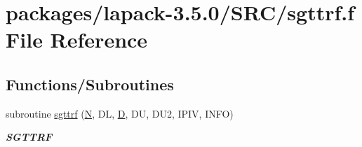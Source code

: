 \hypertarget{sgttrf_8f}{}\section{packages/lapack-\/3.5.0/\+S\+R\+C/sgttrf.f File Reference}
\label{sgttrf_8f}
\subsection*{Functions/\+Subroutines}
\begin{DoxyCompactItemize}
\item 
subroutine \hyperlink{group__realGTcomputational_ga0cd464cdbfc79c87c6b3fa3d1e139abf}{sgttrf} (\hyperlink{polmisc_8c_a0240ac851181b84ac374872dc5434ee4}{N}, D\+L, \hyperlink{odrpack_8h_a7dae6ea403d00f3687f24a874e67d139}{D}, D\+U, D\+U2, I\+P\+I\+V, I\+N\+F\+O)
\begin{DoxyCompactList}\small\item\em {\bfseries S\+G\+T\+T\+R\+F} \end{DoxyCompactList}\end{DoxyCompactItemize}

